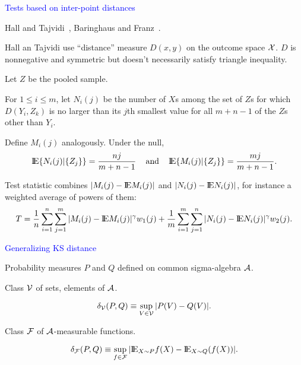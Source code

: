 \documentclass[landscape]{slides}
\newcommand{\EE}{\hbox{I\kern-.1667em\hbox{E}}}
\newcommand{\cA}{{\cal A}}
\newcommand{\cF}{{\cal F}}
\newcommand{\cV}{{\cal V}}
\newcommand{\cX}{{\cal X}}
\newcommand{\beq}{\begin{equation}}
\newcommand{\eeq}{\end{equation}}
\begin{document}
\begin{slide}
\begin{slide}
\end{slide}


\begin{slide}
{\textcolor{blue}{Tests based on inter-point distances}}

Hall and Tajvidi~\cite{hallTajvidi02}, Baringhaus and Franz~\cite{baringhausFranz04}.

Hall an Tajvidi use ``distance'' measure $D(x, y)$ on the outcome space $\cX$.
$D$ is nonnegative and symmetric but doesn't necessarily satisfy triangle inequality.

Let $Z$ be the pooled sample.

For $1 \le i \le m$, let $N_i(j)$ be the number of $X$s among the set of
$Z$s for which $D(Y_i, Z_k)$ is no larger than its $j$th smallest value
for all $m+n-1$ of the $Z$s other than $Y_i$.

Define $M_i(j)$ analogously.  Under the null,
\beq
    \EE \{N_i(j) | \{Z_j\} \} = \frac{nj}{m+n-1} \;\;\; \mbox{ and } \;\;\;
    \EE \{M_i(j) | \{Z_j\} \} = \frac{mj}{m+n-1}.
\eeq

Test statistic combines $| M_i(j) - \EE M_i(j)|$ and $| N_i(j) - \EE N_i(j)|$,
for instance a weighted average of powers of them:
\beq
   T = \frac{1}{n} \sum_{i=1}^n \sum_{j=1}^m | M_i(j) - \EE M_i(j)|^\gamma w_1(j)
       + \frac{1}{m} \sum_{i=1}^m \sum_{j=1}^n | N_i(j) - \EE N_i(j)|^\gamma w_2(j).
\eeq

\end{slide}

\begin{slide}
{\textcolor{blue}{Generalizing KS distance}}

Probability measures $P$ and $Q$ defined on common sigma-algebra $\cA$.

Class $\cV$ of sets, elements of $\cA$.

\beq
   \delta_\cV(P, Q) \equiv \sup_{V \in \cV} | P(V) - Q(V) |.
\eeq

Class $\cF$ of $\cA$-measurable functions.

\beq
   \delta_\cF(P, Q) \equiv \sup_{f \in \cF} | \EE_{X \sim P} f(X) - \EE_{X \sim Q} (f(X)) |.
\eeq

\end{slide}

\begin{slide}


\end{slide}
\end{slide}
\end{document}
